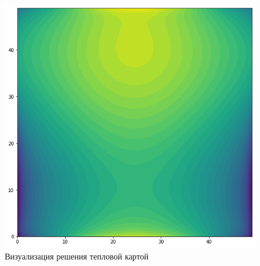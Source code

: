 \documentclass[
]{article}
\begin{document}
\begin{figure}
\centering
\includegraphics{2dFredholm.png}
\caption{Визуализация решения тепловой картой}
\end{figure}
\end{document}
